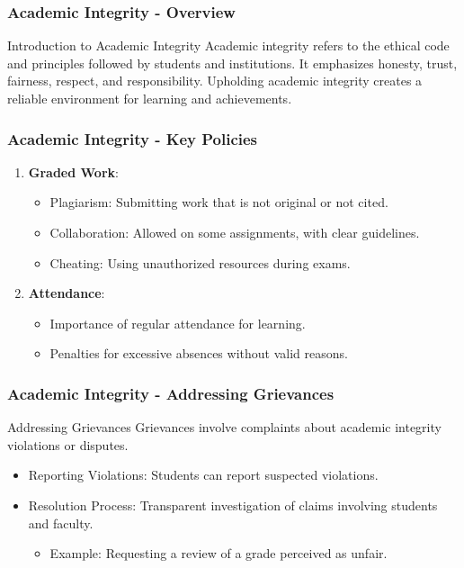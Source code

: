 \documentclass[aspectratio=169]{beamer}
\begin{document}
\begin{frame}[fragile]
    \frametitle{Academic Integrity - Overview}
    \begin{block}{Introduction to Academic Integrity}
        Academic integrity refers to the ethical code and principles followed by students and institutions. It emphasizes honesty, trust, fairness, respect, and responsibility. Upholding academic integrity creates a reliable environment for learning and achievements.
    \end{block}
\end{frame}

\begin{frame}[fragile]
    \frametitle{Academic Integrity - Key Policies}
    \begin{enumerate}
        \item \textbf{Graded Work}:
            \begin{itemize}
                \item Plagiarism: Submitting work that is not original or not cited.
                \item Collaboration: Allowed on some assignments, with clear guidelines.
                \item Cheating: Using unauthorized resources during exams.
            \end{itemize}
        \item \textbf{Attendance}:
            \begin{itemize}
                \item Importance of regular attendance for learning.
                \item Penalties for excessive absences without valid reasons.
            \end{itemize}
    \end{enumerate}
\end{frame}

\begin{frame}[fragile]
    \frametitle{Academic Integrity - Addressing Grievances}
    \begin{block}{Addressing Grievances}
        Grievances involve complaints about academic integrity violations or disputes.
    \end{block}
    \begin{itemize}
        \item Reporting Violations: Students can report suspected violations.
        \item Resolution Process: Transparent investigation of claims involving students and faculty.
        \begin{itemize}
            \item Example: Requesting a review of a grade perceived as unfair.
        \end{itemize}
    \end{itemize}
\end{frame}
\end{document}
